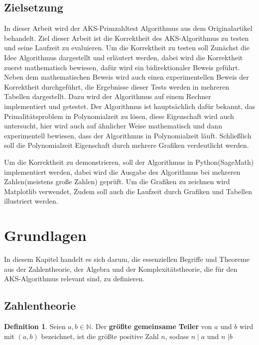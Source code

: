 \documentclass[12pt,oneside]{article}
\theoremstyle{remark}
\theoremstyle{definition}
\newtheorem{definition}{Definition}[section]
\begin{document}
\subsection{Zielsetzung}
In dieser Arbeit wird der AKS-Primzahltest Algorithmus aus dem Originalartikel behandelt. Ziel dieser Arbeit ist die Korrektheit des AKS-Algorithmus zu testen und seine Laufzeit zu evaluieren. Um die Korrektheit zu testen soll Zunächst die Idee Algorithmus dargestellt und erläutert werden, dabei wird die Korrektheit zuerst mathematisch bewiesen, dafür wird ein bidirektionaler Beweis geführt. Neben dem mathematischen Beweis wird auch einen experimentellen Beweis der Korrektheit durchgeführt, die Ergebnisse dieser Tests werden in mehreren Tabellen dargestellt. Dazu wird der Algorithmus auf einem Rechner implementiert und getestet. Der Algorithmus ist hauptsächlich dafür bekannt, das Primalitätsproblem in Polynomialzeit zu lösen, diese Eigenschaft wird auch untersucht, hier wird auch auf ähnlicher Weise mathematisch und dann experimentell bewiesen, dass der Algorithmus in Polynomialzeit läuft. Schließlich soll die Polynomialzeit Eigenschaft durch mehrere Grafiken verdeutlicht werden.  

Um die Korrektheit zu demonstrieren, soll der Algorithmus in Python(SageMath) implementiert werden, dabei wird die Ausgabe des Algorithmus bei mehreren Zahlen(meistens große Zahlen) geprüft. Um die Grafiken zu zeichnen wird Matplotlib verwendet, Zudem soll auch die Laufzeit durch Grafiken und Tabellen illustriert werden. 

\newpage


\section{Grundlagen}
In diesem Kapitel handelt es sich darum, die essenziellen Begriffe und Theoreme aus der Zahlentheorie, der Algebra und der Komplexitätstheorie, die für den AKS-Algorithmus relevant sind, zu definieren.
\subsection{Zahlentheorie}
\theoremstyle{definition}
\begin{definition}\label{Df_1}
Seien $a,b \in \mathbb{N}$. Der \textbf{größte gemeinsame Teiler} von $a$ und $b$ wird mit $(a,b)$ bezeichnet, ist die größte positive Zahl $n$, sodass $n \mid a$ und $n$ $ \mid b$
\end{definition}
\end{document}
